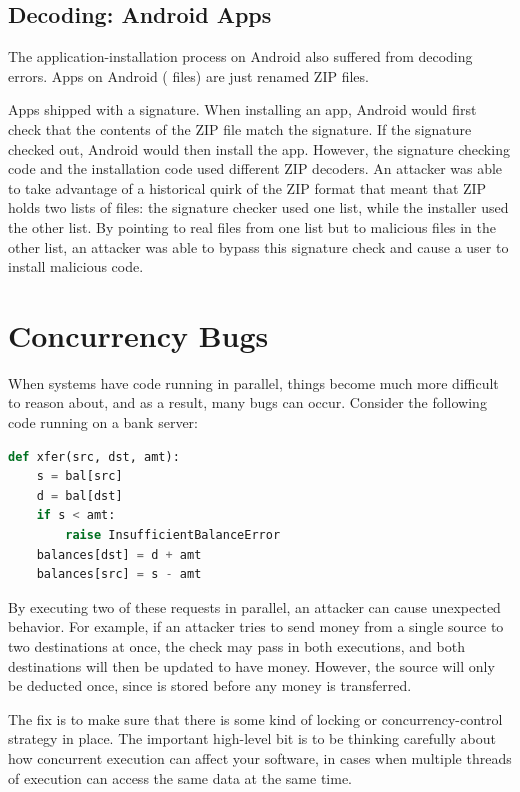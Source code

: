 \subsection{Decoding: Android Apps}
The application-installation process on Android also suffered from decoding errors. Apps on Android ( files) are just renamed ZIP files.

Apps shipped with a signature. When installing an app, Android would first check that the contents of the ZIP file match the signature. If the signature checked out, Android would then install the app. However, the signature checking code and the installation code used different ZIP decoders. An attacker was able to take advantage of a historical quirk of the ZIP format that meant that ZIP holds two lists of files: the signature checker used one list, while the installer used the other list. By pointing to real files from one list but to malicious files in the other list, an attacker was able to bypass this signature check and cause a user to install malicious code.

\section{Concurrency Bugs}
When systems have code running in parallel, things become much more difficult to reason about, and as a result, many bugs can occur. Consider the following code running on a bank server:

\begin{lstlisting}[language=python]
def xfer(src, dst, amt):
	s = bal[src]
	d = bal[dst]
	if s < amt:
		raise InsufficientBalanceError
	balances[dst] = d + amt
	balances[src] = s - amt
\end{lstlisting}

By executing two of these  requests in parallel, an attacker can cause unexpected behavior. For example, if an attacker tries to send money from a single source to two destinations at once, the check  may pass in both executions, and both destinations will then be updated to have money. However, the source will only be deducted once, since  is stored before any money is transferred.

The fix is to make sure that there is some kind of locking or concurrency-control
strategy in place.
The important high-level bit is to be thinking carefully about how concurrent
execution can affect your software, in cases when multiple threads of
execution can access the same data at the same time.


